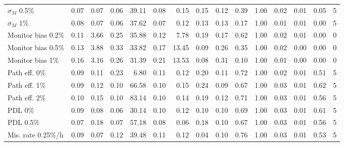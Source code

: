 \begin{tabular}{lrrrrrrrrrrrrrr}
$\sigma_M$ 0.5\% & 0.07 & 0.07 & 0.06 & 39.11 & 0.08 & 0.15 & 0.15 & 0.12 & 0.39 & 1.00 & 0.02 & 0.01 & 0.05 & 5\\
$\sigma_M$ 1\% & 0.08 & 0.07 & 0.06 & 37.62 & 0.07 & 0.12 & 0.13 & 0.13 & 0.17 & 1.00 & 0.01 & 0.01 & 0.00 & 5\\
Monitor bias 0.2\% & 0.11 & 3.66 & 0.25 & 35.88 & 0.12 & 7.78 & 0.19 & 0.17 & 0.62 & 1.00 & 0.02 & 0.01 & 0.00 & 0\\
Monitor bias 0.5\% & 0.13 & 3.88 & 0.33 & 33.82 & 0.17 & 13.45 & 0.09 & 0.26 & 0.35 & 1.00 & 0.02 & 0.00 & 0.00 & 0\\
Monitor bias 1\% & 0.16 & 3.16 & 0.26 & 31.39 & 0.21 & 13.53 & 0.08 & 0.31 & 0.10 & 1.00 & 0.01 & 0.00 & 0.00 & 0\\
Path eff. 0\% & 0.09 & 0.11 & 0.23 & 6.80 & 0.11 & 0.12 & 0.20 & 0.11 & 0.72 & 1.00 & 0.02 & 0.01 & 0.51 & 5\\
Path eff. 1\% & 0.09 & 0.12 & 0.10 & 66.58 & 0.10 & 0.15 & 0.24 & 0.09 & 0.67 & 1.00 & 0.03 & 0.01 & 0.62 & 5\\
Path eff. 2\% & 0.10 & 0.15 & 0.10 & 83.14 & 0.10 & 0.14 & 0.19 & 0.12 & 0.71 & 1.00 & 0.03 & 0.01 & 0.56 & 5\\
PDL 0\% & 0.09 & 0.08 & 0.06 & 30.14 & 0.10 & 0.12 & 0.10 & 0.10 & 0.69 & 1.00 & 0.03 & 0.01 & 0.61 & 5\\
PDL 0.5\% & 0.07 & 0.18 & 0.07 & 57.18 & 0.08 & 0.06 & 0.18 & 0.10 & 0.67 & 1.00 & 0.03 & 0.01 & 0.56 & 5\\
Mis. rate 0.25\%/h & 0.09 & 0.07 & 0.12 & 39.48 & 0.11 & 0.12 & 0.04 & 0.10 & 0.76 & 1.00 & 0.03 & 0.01 & 0.53 & 5\\
\hline
\end{tabular}